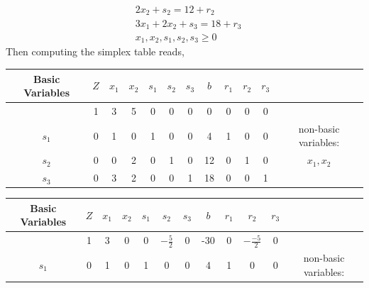\begin{enumerate}
\begin{align*}
                                      & 2x_2 + s_2 = 12 + r_2          \\
                                      & 3x_1 + 2x_2 + s_3 = 18 + r_3   \\
                                      & x_1, x_2, s_1, s_2, s_3 \geq 0
          \end{align*}
          Then computing the simplex table reads,
          \begin{center}
              \begin{tabular}{|c|c|c c c c c|c|c c c|c|}
                  \hline
                  Basic Variables & \(Z\) & \(x_1\) & \(x_2\) & \(s_1\) & \(s_2\) & \(s_3\) & \(b\) & \(r_1\) & \(r_2\) & \(r_3\) &                      \\
                  \hline
                                  & 1     & 3       & 5       & 0       & 0       & 0       & 0     & 0       & 0       & 0       &                      \\
                  \hline
                  \(s_1\)         & 0     & 1       & 0       & 1       & 0       & 0       & 4     & 1       & 0       & 0       & non-basic variables: \\
                  \(s_2\)         & 0     & 0       & 2       & 0       & 1       & 0       & 12    & 0       & 1       & 0       & \(x_1, x_2\)         \\
                  \(s_3\)         & 0     & 3       & 2       & 0       & 0       & 1       & 18    & 0       & 0       & 1       &                      \\
                  \hline
              \end{tabular}
          \end{center}
          \begin{center}
              \begin{tabular}{|c|c|c c c c c|c|c c c|c|}
                  \hline
                  Basic Variables & \(Z\) & \(x_1\) & \(x_2\) & \(s_1\) & \(s_2\)          & \(s_3\) & \(b\) & \(r_1\) & \(r_2\)           & \(r_3\) &                      \\
                  \hline
                                  & 1     & 3       & 0       & 0       & \(-\frac{5}{2}\) & 0       & -30   & 0       & \(-\frac{-5}{2}\) & 0       &                      \\
                  \hline
                  \(s_1\)         & 0     & 1       & 0       & 1       & 0                & 0       & 4     & 1       & 0                 & 0       & non-basic variables: \\

\end{tabular}
\end{center}
\end{enumerate}
